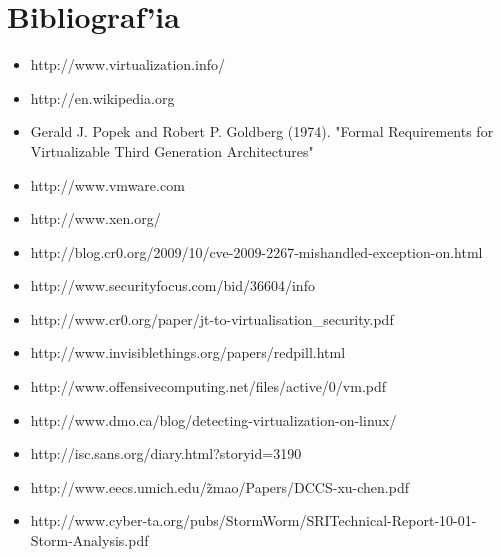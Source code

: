 \section{Bibliograf'ia}

\begin{itemize}
	\item http://www.virtualization.info/
	\item http://en.wikipedia.org
	\item Gerald J. Popek and Robert P. Goldberg (1974). "Formal Requirements for Virtualizable Third Generation Architectures"
	\item http://www.vmware.com
	\item http://www.xen.org/
	\item http://blog.cr0.org/2009/10/cve-2009-2267-mishandled-exception-on.html
	\item http://www.securityfocus.com/bid/36604/info
	\item http://www.cr0.org/paper/jt-to-virtualisation\_security.pdf
	\item http://www.invisiblethings.org/papers/redpill.html
	\item http://www.offensivecomputing.net/files/active/0/vm.pdf
	\item http://www.dmo.ca/blog/detecting-virtualization-on-linux/
	\item http://isc.sans.org/diary.html?storyid=3190
	\item http://www.eecs.umich.edu/\~zmao/Papers/DCCS-xu-chen.pdf
	\item http://www.cyber-ta.org/pubs/StormWorm/SRITechnical-Report-10-01-Storm-Analysis.pdf
\end{itemize}